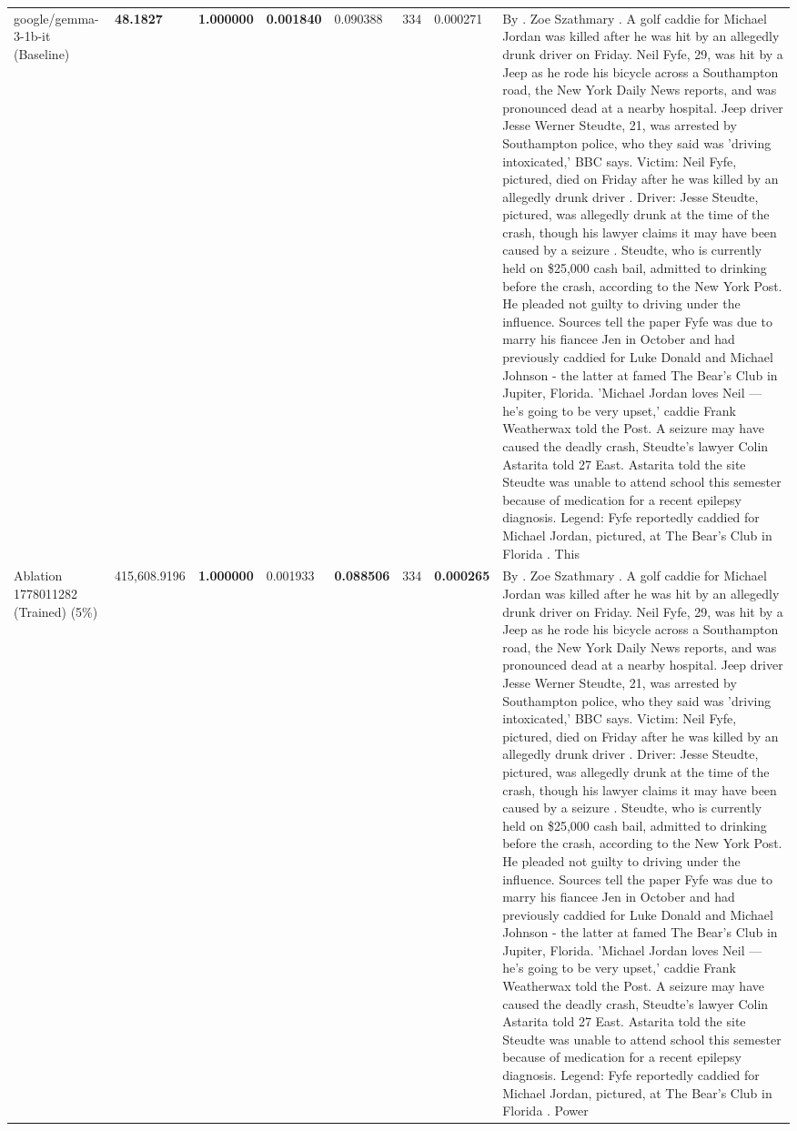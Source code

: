\begin{table}[H]
\begin{tabular}{llrlllll}
google/gemma-3-1b-it (Baseline) & \bfseries 48.1827 & \bfseries 1.000000 & \bfseries 0.001840 & 0.090388 & 334 & 0.000271 & By . Zoe Szathmary . A golf caddie for Michael Jordan was killed after he was hit by an allegedly drunk driver on Friday. Neil Fyfe, 29, was hit by a Jeep as he rode his bicycle across a Southampton road, the New York Daily News reports, and was pronounced dead at a nearby hospital. Jeep driver Jesse Werner Steudte, 21, was arrested by Southampton police, who they said was 'driving intoxicated,' BBC says. Victim: Neil Fyfe, pictured, died on Friday after he was killed by an allegedly drunk driver . Driver: Jesse Steudte, pictured, was allegedly drunk at the time of the crash, though his lawyer claims it may have been caused by a seizure . Steudte, who is currently held on \$25,000 cash bail, admitted to drinking before the crash, according to the New York Post. He pleaded not guilty to driving under the influence. Sources tell the paper Fyfe was due to marry his fiancee Jen in October and had previously caddied for Luke Donald and Michael Johnson - the latter at famed The Bear's Club in Jupiter, Florida. 'Michael Jordan loves Neil — he’s going to be very upset,' caddie Frank Weatherwax told the Post. A seizure may have caused the deadly crash, Steudte's lawyer Colin Astarita told 27 East. Astarita told the site Steudte was unable to attend school this semester because of medication for a recent epilepsy diagnosis. Legend: Fyfe reportedly caddied for Michael Jordan, pictured, at The Bear's Club in Florida . This \\
Ablation 1778011282 (Trained) (5\%) & \color{red} 415,608.9196 & \bfseries \color{red} 1.000000 & \color{red} 0.001933 & \bfseries \color{red} 0.088506 & \color{red} 334 & \bfseries \color{red} 0.000265 & By . Zoe Szathmary . A golf caddie for Michael Jordan was killed after he was hit by an allegedly drunk driver on Friday. Neil Fyfe, 29, was hit by a Jeep as he rode his bicycle across a Southampton road, the New York Daily News reports, and was pronounced dead at a nearby hospital. Jeep driver Jesse Werner Steudte, 21, was arrested by Southampton police, who they said was 'driving intoxicated,' BBC says. Victim: Neil Fyfe, pictured, died on Friday after he was killed by an allegedly drunk driver . Driver: Jesse Steudte, pictured, was allegedly drunk at the time of the crash, though his lawyer claims it may have been caused by a seizure . Steudte, who is currently held on \$25,000 cash bail, admitted to drinking before the crash, according to the New York Post. He pleaded not guilty to driving under the influence. Sources tell the paper Fyfe was due to marry his fiancee Jen in October and had previously caddied for Luke Donald and Michael Johnson - the latter at famed The Bear's Club in Jupiter, Florida. 'Michael Jordan loves Neil — he’s going to be very upset,' caddie Frank Weatherwax told the Post. A seizure may have caused the deadly crash, Steudte's lawyer Colin Astarita told 27 East. Astarita told the site Steudte was unable to attend school this semester because of medication for a recent epilepsy diagnosis. Legend: Fyfe reportedly caddied for Michael Jordan, pictured, at The Bear's Club in Florida . Power \\

\end{tabular}
\end{table}
